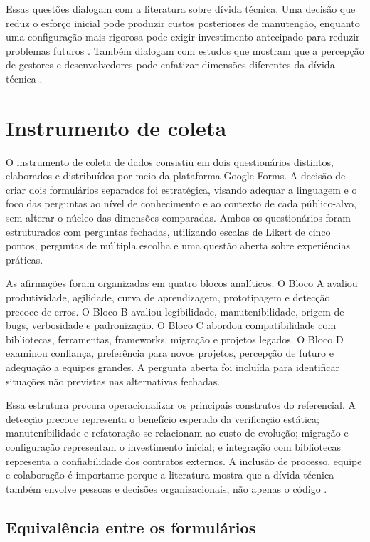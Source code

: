 Essas questões dialogam com a literatura sobre dívida técnica. Uma decisão que reduz o esforço inicial pode produzir custos posteriores de manutenção, enquanto uma configuração mais rigorosa pode exigir investimento antecipado para reduzir problemas futuros \cite{alves2016debt}. Também dialogam com estudos que mostram que a percepção de gestores e desenvolvedores pode enfatizar dimensões diferentes da dívida técnica \cite{gomes2023debt}.

\section{Instrumento de coleta}

O instrumento de coleta de dados consistiu em dois questionários distintos, elaborados e distribuídos por meio da plataforma Google Forms. A decisão de criar dois formulários separados foi estratégica, visando adequar a linguagem e o foco das perguntas ao nível de conhecimento e ao contexto de cada público-alvo, sem alterar o núcleo das dimensões comparadas. Ambos os questionários foram estruturados com perguntas fechadas, utilizando escalas de Likert de cinco pontos, perguntas de múltipla escolha e uma questão aberta sobre experiências práticas.

As afirmações foram organizadas em quatro blocos analíticos. O Bloco A avaliou produtividade, agilidade, curva de aprendizagem, prototipagem e detecção precoce de erros. O Bloco B avaliou legibilidade, manutenibilidade, origem de bugs, verbosidade e padronização. O Bloco C abordou compatibilidade com bibliotecas, ferramentas, frameworks, migração e projetos legados. O Bloco D examinou confiança, preferência para novos projetos, percepção de futuro e adequação a equipes grandes. A pergunta aberta foi incluída para identificar situações não previstas nas alternativas fechadas.

Essa estrutura procura operacionalizar os principais construtos do referencial. A detecção precoce representa o benefício esperado da verificação estática; manutenibilidade e refatoração se relacionam ao custo de evolução; migração e configuração representam o investimento inicial; e integração com bibliotecas representa a confiabilidade dos contratos externos. A inclusão de processo, equipe e colaboração é importante porque a literatura mostra que a dívida técnica também envolve pessoas e decisões organizacionais, não apenas o código \cite{gomes2023debt,coutinho2024agile}.

\subsection{Equivalência entre os formulários}

